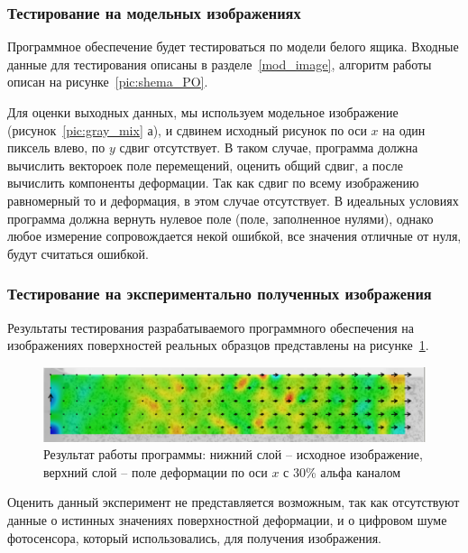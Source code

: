 \subsubsection{Тестирование на модельных изображениях}

Программное обеспечение будет тестироваться по модели белого ящика. Входные данные для тестирования описаны в разделе~\ref{mod_image}, алгоритм работы описан на рисунке~\ref{pic:shema_PO}.

Для оценки выходных данных, мы используем модельное изображение (рисунок~\ref{pic:gray_mix} а), и сдвинем исходный рисунок по оси $x$ на один пиксель влево, по $y$ сдвиг отсутствует.
В таком случае, программа должна вычислить вектороек поле перемещений, оценить общий сдвиг, а после вычислить компоненты деформации. Так как сдвиг по всему изображению равномерный то и деформация, в этом случае отсутствует. В идеальных условиях программа должна вернуть нулевое поле (поле, заполненное нулями), однако любое измерение сопровождается некой ошибкой, все значения отличные от нуля, будут считаться ошибкой.

\subsubsection{Тестирование на экспериментально полученных изображения}
Результаты тестирования разрабатываемого программного обеспечения на изображениях поверхностей реальных образцов представлены на рисунке~\ref{fig:al_strain}.

\begin{figure}
\centering
\includegraphics[width=0.7\linewidth]{images/al_strain}
\caption{Результат работы программы: нижний слой -- исходное изображение, верхний слой -- поле деформации по оси $x$ с 30\% альфа каналом}
\label{fig:al_strain}
\end{figure}
Оценить данный эксперимент не представляется возможным, так как отсутствуют данные о истинных значениях поверхностной деформации, и о цифровом  шуме фотосенсора, который использовались, для получения изображения.

